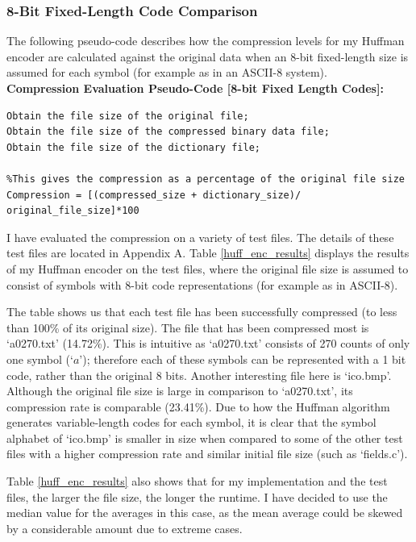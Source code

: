 \documentclass[12pt]{article}
\begin{document}
\subsubsection{8-Bit Fixed-Length Code Comparison}
The following pseudo-code describes how the compression levels for my Huffman encoder are calculated against the original data when an 8-bit fixed-length size is assumed for each symbol (for example as in an ASCII-8 system).
\\\textbf{Compression Evaluation Pseudo-Code [8-bit Fixed Length Codes]:}
\begin{verbatim}
Obtain the file size of the original file;
Obtain the file size of the compressed binary data file;
Obtain the file size of the dictionary file;

%This gives the compression as a percentage of the original file size
Compression = [(compressed_size + dictionary_size)/ original_file_size]*100

\end{verbatim}

I have evaluated the compression on a variety of test files. The details of these test files are located in Appendix A. Table \ref{huff_enc_results} displays the results of my Huffman encoder on the test files, where the original file size is assumed to consist of symbols with 8-bit code representations (for example as in ASCII-8). 

The table shows us that each test file has been successfully compressed (to less than 100\% of its original size). The file that has been compressed most is `a0270.txt' (14.72\%). This is intuitive as `a0270.txt' consists of 270 counts of only one symbol (`$a$'); therefore each of these symbols can be represented with a 1 bit code, rather than the original 8 bits. Another interesting file here is `ico.bmp'. Although the original file size is large in comparison to `a0270.txt', its compression rate is comparable (23.41\%). Due to how the Huffman algorithm generates variable-length codes for each symbol, it is clear that the symbol alphabet of `ico.bmp' is smaller in size when compared to some of the other test files with a higher compression rate and similar initial file size (such as `fields.c').

Table \ref{huff_enc_results} also shows that for my implementation and the test files, the larger the file size, the longer the runtime. I have decided to use the median value for the averages in this case, as the mean average could be skewed by a considerable amount due to extreme cases.
\end{document}
